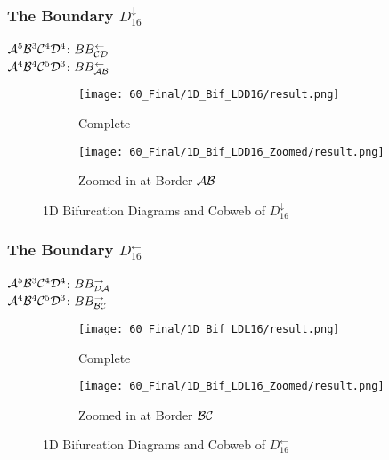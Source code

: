 \subsubsection{The Boundary $D_{16}^\downarrow$}

$\mathcal{A}^5\mathcal{B}^3\mathcal{C}^4\mathcal{D}^4$: $BB_{\mathcal{C}\mathcal{D}}^\leftarrow$ \\
$\mathcal{A}^4\mathcal{B}^4\mathcal{C}^5\mathcal{D}^3$: $BB_{\mathcal{A}\mathcal{B}}^\leftarrow$

\begin{figure}
    \centering
    \begin{subfigure}{0.4\textwidth}
        \centering
        \texttt{[image: 60\_Final/1D\_Bif\_LDD16/result.png]}
        \caption{Complete}
        \label{fig:final.bifurcation.D.down}
    \end{subfigure}
    \begin{subfigure}{0.4\textwidth}
        \centering
        \texttt{[image: 60\_Final/1D\_Bif\_LDD16\_Zoomed/result.png]}
        \caption{Zoomed in at Border $\mathcal{A}\mathcal{B}$}
        \label{fig:final.bifurcation.D.down.zoomed}
    \end{subfigure}
    \caption{1D Bifurcation Diagrams and Cobweb of $D_{16}^\downarrow$}
\end{figure}

\subsubsection{The Boundary $D_{16}^\leftarrow$}

$\mathcal{A}^5\mathcal{B}^3\mathcal{C}^4\mathcal{D}^4$: $BB_{\mathcal{D}\mathcal{A}}^\rightarrow$ \\
$\mathcal{A}^4\mathcal{B}^4\mathcal{C}^5\mathcal{D}^3$: $BB_{\mathcal{B}\mathcal{C}}^\rightarrow$

\begin{figure}
    \centering
    \begin{subfigure}{0.4\textwidth}
        \centering
        \texttt{[image: 60\_Final/1D\_Bif\_LDL16/result.png]}
        \caption{Complete}
        \label{fig:final.bifurcation.D.left}
    \end{subfigure}
    \begin{subfigure}{0.4\textwidth}
        \centering
        \texttt{[image: 60\_Final/1D\_Bif\_LDL16\_Zoomed/result.png]}
        \caption{Zoomed in at Border $\mathcal{B}\mathcal{C}$}
        \label{fig:final.bifurcation.D.left.zoomed}
    \end{subfigure}
    \caption{1D Bifurcation Diagrams and Cobweb of $D_{16}^\leftarrow$}
\end{figure}
